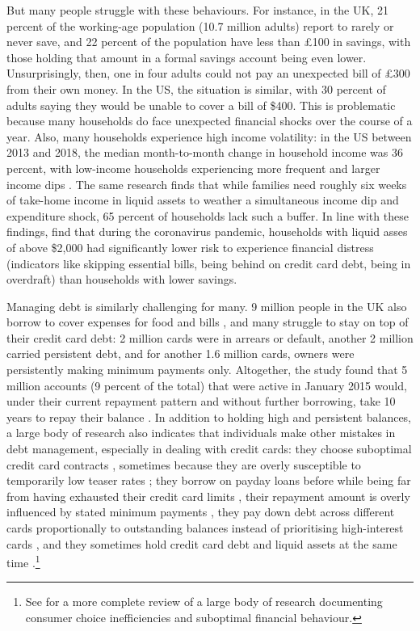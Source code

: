 But many people struggle with these behaviours. For instance, in the UK, 21
percent of the working-age population (10.7 million adults) report to rarely or
never save, and 22 percent of the population have less than \pounds100 in
savings, with those holding that amount in a formal savings account being even
lower. Unsurprisingly, then, one in four adults could not pay an unexpected
bill of \pounds300 from their own money. In the US, the situation is similar,
with 30 percent of adults saying they would be unable to cover a bill of \$400.
This is problematic because many households do face unexpected financial shocks
over the course of a year. Also, many households experience high income
volatility: in the US between 2013 and 2018, the median month-to-month change
in household income was 36 percent, with low-income households experiencing
more frequent and larger income dips \citep{jpmorgan2019weathering}. The same
research finds that while families need roughly six weeks of take-home income
in liquid assets to weather a simultaneous income dip and expenditure shock, 65
percent of households lack such a buffer. In line with these findings,
\citet{roll2020income} find that during the coronavirus pandemic, households
with liquid asses of above \$2,000 had significantly lower risk to experience
financial distress (indicators like skipping essential bills, being behind on
credit card debt, being in overdraft) than households with lower savings.

Managing debt is similarly challenging for many. 9 million people in the UK
also borrow to cover expenses for food and bills \citep{mps2018building}, and
many struggle to stay on top of their credit card debt: 2 million cards were in
arrears or default, another 2 million carried persistent debt, and for another
1.6 million cards, owners were persistently making minimum payments only.
Altogether, the study found that 5 million accounts (9 percent of the total)
that were active in January 2015 would, under their current repayment pattern
and without further borrowing, take 10 years to repay their balance
\citep{fca2016credit}. In addition to holding high and persistent balances, a
large body of research also indicates that individuals make other mistakes in
debt management, especially in dealing with credit cards: they choose
suboptimal credit card contracts \citep{agarwal2015consumers}, sometimes
because they are overly susceptible to temporarily low teaser rates
\citep{shui2004time, ausubel1991failure}; they borrow on payday loans before
while being far from having exhausted their credit card limits
\citep{agarwal2009payday}, their repayment amount is overly influenced by
stated minimum payments \citep{sakaguchi2022default}, they pay down debt across
different cards proportionally to outstanding balances instead of prioritising
high-interest cards \citep{gathergood2019individuals}, and they sometimes hold
credit card debt and liquid assets at the same time \citep{gross2002liquidity,
    gathergood2020co}.\footnote{See \citet{agarwal2017shapes} for a more
    complete review of a large body of research documenting consumer choice
inefficiencies and suboptimal financial behaviour.} 


